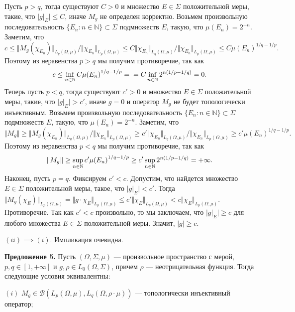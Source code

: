 \documentclass[11pt,twoside]{article}
\begin{document}
        Пусть $p>q$, тогда существуют $C>0$ и множество $E\in\Sigma$
        положительной меры, такие, что $|g|_E|\leq C$, иначе $M_g$ не определен
        корректно. Возьмем произвольную последовательность
    $\{E_n:n\in\mathbb{N}\}\subset\Sigma$ подмножеств $E$, такую, что
    $\mu(E_n)=2^{-n}$. Заметим, что
$$
    c
    \leq \Vert M_g(\chi_{E_n})\Vert_{L_q(\Omega,\mu)} /
    \Vert \chi_{E_n}\Vert_{L_p(\Omega,\mu)}
    \leq C\Vert\chi_{E_n}\Vert_{L_q(\Omega,\mu)} /
    \Vert \chi_{E_n}\Vert_{L_p(\Omega,\mu)}
    \leq C{\mu(E_n)}^{1/q-1/p}.
$$
Поэтому из неравенства $p>q$ мы получим противоречие, так как
$$
    c \leq\inf_{n\in\mathbb{N}}C{\mu(E_n)}^{1/q-1/p}
    =\\=C\inf_{n\in\mathbb{N}} 2^{n(1/p-1/q)}=0.
$$
Теперь пусть $p<q$, тогда существуют $c'>0$ и множество $E\in\Sigma$
положительной меры, такие, что $|g|_E|>c'$, иначе $g=0$ и оператор $M_g$ не
будет топологически инъективным. Возьмем произвольную последовательность
$\{E_n:n\in\mathbb{N}\}\subset\Sigma$  подмножеств $E$, такую, что
$\mu(E_n)=2^{-n}$. Заметим, что
$$
    \Vert M_g\Vert
    \geq \Vert M_g(\chi_{E_n})\Vert_{L_q(\Omega,\mu)} /
    \Vert \chi_{E_n}\Vert_{L_p(\Omega,\mu)}
    \geq c'\Vert\chi_{E_n}\Vert_{L_q(\Omega,\mu)} /
    \Vert \chi_{E_n}\Vert_{L_p(\Omega,\mu)}
    \geq c'{\mu(E_n)}^{1/q-1/p}.
$$
Поэтому из неравенства $p<q$ мы получим противоречие, так как
$$
    \Vert M_g\Vert
    \geq\sup_{n\in\mathbb{N}}c'{\mu(E_n)}^{1/q-1/p}\\
    \geq c'\sup_{n\in\mathbb{N}}2^{n(1/p-1/q)}
    =+\infty.
$$
Наконец, пусть $p=q$. Фиксируем $c'<c$. Допустим, что найдется множество
$E\in\Sigma$ положительной меры, такое, что $|g|_{E}|<c'$. Тогда $\Vert
    M_g(\chi_{E})\Vert_{L_p(\Omega,\mu)} =\Vert g
    \cdot\chi_{E}\Vert_{L_p(\Omega,\mu)} \leq c' \Vert
    \chi_{E}\Vert_{L_p(\Omega,\mu)} <c\Vert \chi_{E}\Vert_{L_p(\Omega,\mu)}$.
Противоречие. Так как $c'<c$ произвольно, то мы заключаем, что $|g|_E|\geq c$
для любого множества $E\in\Sigma$ положительной меры. Значит, $|g|\geq c$.

$(ii)$$\implies$$ (i)$. Импликация очевидна.

        \textbf{Предложение 5.} Пусть $(\Omega,\Sigma,\mu)$ --- произвольное
        пространство с мерой, $p,q\in[1,+\infty]$ и $g,\rho\in
    L_0(\Omega,\Sigma)$, причем $\rho$ --- неотрицательная функция. Тогда
        следующие условия эквивалентны:

    $(i)$ $M_g\in\mathcal{B}(L_p(\Omega,\mu),L_q(\Omega,\rho\cdot\mu))$ ---
        топологически инъективный оператор;
\end{document}
